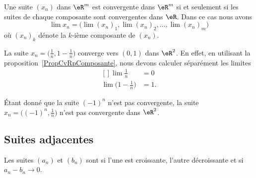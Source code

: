 \begin{proposition}     \label{PropCvRpComposante}
	Une suite \( (x_n)\) dans \( \eR^m\) est convergente dans \( \eR^m\) si et seulement si les suites de chaque composante sont convergentes dans \( \eR\). Dans ce cas nous avons
	\begin{equation}
		\lim x_n=\Big( \lim(x_n)_1,\lim (x_n)_2,\ldots,\lim (x_n)_m \Big)
	\end{equation}
	où \( (x_n)_k\) dénote la \( k\)-ième composante de \( (x_n)\).
\end{proposition}

\begin{example}
	La suite \( x_n=\big( \frac{1}{ n },1-\frac{1}{ n } \big)\) converge vers \( (0,1)\) dans \( \eR^2\). En effet, en utilisant la proposition~\ref{PropCvRpComposante}, nous devons calculer séparément les limites
	\begin{equation}
		\begin{aligned}[]
			\lim\frac{1}{ n }               & =0  \\
			\lim\big( 1-\frac{1}{ n } \big) & =1.
		\end{aligned}
	\end{equation}
\end{example}

\begin{example}
	Étant donné que la suite \( (-1)^n\) n'est pas convergente, la suite \( x_n=\big( (-1)^n,\frac{1}{ n } \big)\) n'est pas convergente dans \( \eR^2\).
\end{example}

\subsection{Suites adjacentes}

\begin{definition}         \label{DEFooDMZLooDtNPmu}
	Les suites \( (a_n)\) et \( (b_n)\) sont  si l'une est croissante, l'autre décroissante et si \( a_n-b_n\to 0\).
\end{definition}

